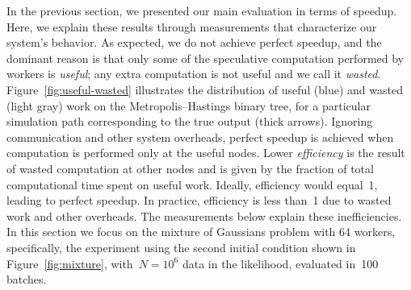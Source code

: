 \documentclass[angelino.tex]{subfiles}
\begin{document}
In the previous section, we presented our main evaluation in terms of speedup.
Here, we explain these results through measurements that characterize our system's behavior.
As expected, we do not achieve perfect speedup, and the dominant reason is that
only some of the speculative computation performed by workers is \emph{useful};
any extra computation is not useful and we call it \emph{wasted}.
Figure~\ref{fig:useful-wasted} illustrates the distribution of useful (blue)
and wasted (light gray) work on the Metropolis--Hastings binary tree,
for a particular simulation path corresponding to the true output (thick arrows).
Ignoring communication and other system overheads, perfect speedup is achieved
when computation is performed only at the useful nodes.
Lower \emph{efficiency} is the result of wasted computation at other nodes
and is given by the fraction of total computational time spent on useful work.
Ideally, efficiency would equal~1, leading to perfect speedup.
In practice, efficiency is less than~1 due to wasted work and other overheads.
The measurements below explain these inefficiencies.
In this section we focus on the mixture of
Gaussians problem with 64 workers, specifically, the experiment using
the second initial condition shown in Figure~\ref{fig:mixture},
with~$N=10^6$ data in the likelihood, evaluated in~100 batches.
\end{document}
